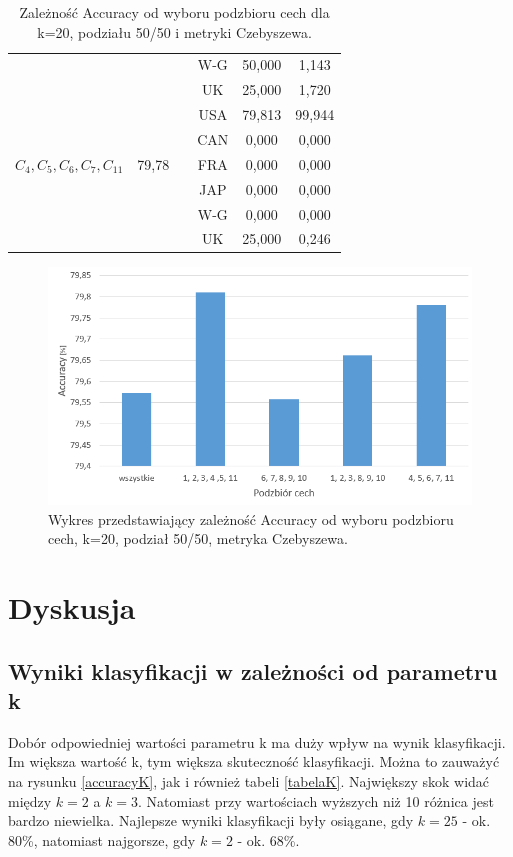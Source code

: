 \documentclass{classrep}
\begin{document}
\begin{table}[h!]
\begin{tabular} {c c c c c c}
		&												&\vline& W-G & 50,000 & 1,143 \\
		&		 										&\vline& UK  & 25,000 & 1,720 \\
		\hline 
		&   										&\vline& USA & 79,813 & 99,944 \\
		&											&\vline& CAN & 0,000 & 0,000 \\
		$C_4, C_5, C_6, C_7, C_{11}$ & 79,78        &\vline& FRA & 0,000 & 0,000 \\
		&											&\vline& JAP & 0,000 & 0,000 \\
		&											&\vline& W-G & 0,000 & 0,000 \\
		&		 									&\vline& UK  & 25,000 & 0,246 \\
		\hline 
		\hline
	\end{tabular}
	\caption{Zależność Accuracy od wyboru podzbioru cech dla k=20, podziału 50/50 i metryki Czebyszewa. }
	\label{tabelaFeatures}
\end{table}

\begin{figure}[h!]
    \centering
    \includegraphics[width=1\textwidth]{accuracyFeatures.png}
    \caption{Wykres przedstawiający zależność Accuracy od wyboru podzbioru cech, k=20, podział 50/50, metryka Czebyszewa.}
    \label{accuracyFeatures}
\end{figure}

\newpage
\section{Dyskusja} %
\subsection{Wyniki klasyfikacji w zależności od parametru k}
Dobór odpowiedniej wartości parametru k ma duży wpływ na wynik klasyfikacji. Im większa wartość k, tym większa skuteczność klasyfikacji. Można to zauważyć na rysunku \ref{accuracyK}, jak i również tabeli \ref{tabelaK}. Największy skok widać między $k=2$ a $k=3$. Natomiast przy wartościach wyższych niż 10 różnica jest bardzo niewielka. Najlepsze wyniki klasyfikacji były osiągane, gdy $k=25$ - ok. 80\%, natomiast najgorsze, gdy $k=2$ - ok. 68\%.
\end{document}
